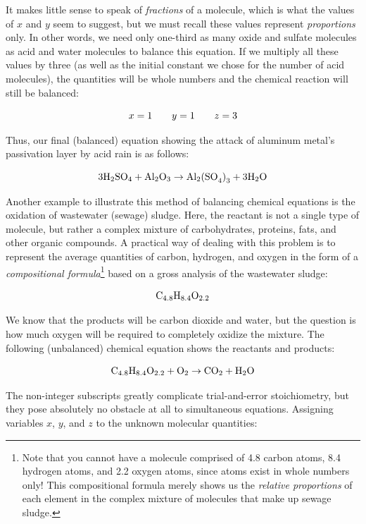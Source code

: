 It makes little sense to speak of \textit{fractions} of a molecule, which is what the values of $x$ and $y$ seem to suggest, but we must recall these values represent \textit{proportions} only.  In other words, we need only one-third as many oxide and sulfate molecules as acid and water molecules to balance this equation.  If we multiply all these values by three (as well as the initial constant we chose for the number of acid molecules), the quantities will be whole numbers and the chemical reaction will still be balanced:

$$x = 1 \hskip 20pt y = 1 \hskip 20pt z = 3$$

Thus, our final (balanced) equation showing the attack of aluminum metal's passivation layer by acid rain is as follows:

$$\hbox{3H}_2\hbox{SO}_4 + \hbox{Al}_2\hbox{O}_3 \rightarrow \hbox{Al}_2\hbox{(SO}_4\hbox{)}_3 + \hbox{3H}_2\hbox{O}$$

\vskip 10pt

\filbreak

Another example to illustrate this method of balancing chemical equations is the oxidation of wastewater (sewage) sludge.  Here, the reactant is not a single type of molecule, but rather a complex mixture of carbohydrates, proteins, fats, and other organic compounds.  A practical way of dealing with this problem is to represent the average quantities of carbon, hydrogen, and oxygen in the form of a \textit{compositional formula}\footnote{Note that you cannot have a molecule comprised of 4.8 carbon atoms, 8.4 hydrogen atoms, and 2.2 oxygen atoms, since atoms exist in whole numbers only!  This compositional formula merely shows us the \textit{relative proportions} of each element in the complex mixture of molecules that make up sewage sludge.} based on a gross analysis of the wastewater sludge:  

$$\hbox{C}_{4.8}\hbox{H}_{8.4}\hbox{O}_{2.2}$$

We know that the products will be carbon dioxide and water, but the question is how much oxygen will be required to completely oxidize the mixture.  The following (unbalanced) chemical equation shows the reactants and products:

$$\hbox{C}_{4.8}\hbox{H}_{8.4}\hbox{O}_{2.2} + \hbox{O}_2 \to \hbox{CO}_2 + \hbox{H}_2\hbox{O}$$

The non-integer subscripts greatly complicate trial-and-error stoichiometry, but they pose absolutely no obstacle at all to simultaneous equations.  Assigning variables $x$, $y$, and $z$ to the unknown molecular quantities:

